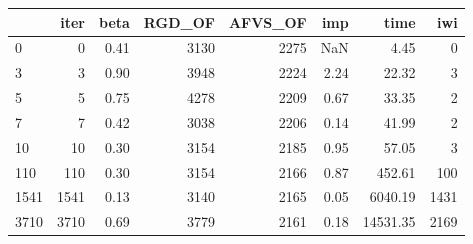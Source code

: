 \begin{tabular}{lrrrrrrr}
\toprule
{} &  iter &  beta &  RGD\_OF &  AFVS\_OF &  imp &     time &   iwi \\
\midrule
0    &     0 &  0.41 &    3130 &     2275 &  NaN &     4.45 &     0 \\
3    &     3 &  0.90 &    3948 &     2224 & 2.24 &    22.32 &     3 \\
5    &     5 &  0.75 &    4278 &     2209 & 0.67 &    33.35 &     2 \\
7    &     7 &  0.42 &    3038 &     2206 & 0.14 &    41.99 &     2 \\
10   &    10 &  0.30 &    3154 &     2185 & 0.95 &    57.05 &     3 \\
110  &   110 &  0.30 &    3154 &     2166 & 0.87 &   452.61 &   100 \\
1541 &  1541 &  0.13 &    3140 &     2165 & 0.05 &  6040.19 &  1431 \\
3710 &  3710 &  0.69 &    3779 &     2161 & 0.18 & 14531.35 &  2169 \\
\bottomrule
\end{tabular}
